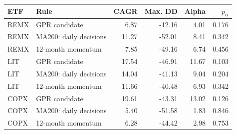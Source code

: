 \begin{tabular}{@{}llrrrr@{}}
\toprule
ETF & Rule & CAGR & Max. DD & Alpha & $p_{\alpha}$ \\
\midrule
REMX & GPR candidate & 6.87 & -12.16 & 4.01 & 0.176 \\
REMX & MA200: daily decisions & 11.27 & -52.01 & 8.41 & 0.342 \\
REMX & 12-month momentum & 7.85 & -49.16 & 6.74 & 0.456 \\
LIT & GPR candidate & 17.54 & -46.91 & 11.67 & 0.103 \\
LIT & MA200: daily decisions & 14.04 & -41.13 & 9.04 & 0.204 \\
LIT & 12-month momentum & 11.66 & -40.48 & 6.93 & 0.342 \\
COPX & GPR candidate & 19.61 & -43.31 & 13.02 & 0.126 \\
COPX & MA200: daily decisions & 5.40 & -51.58 & 1.83 & 0.846 \\
COPX & 12-month momentum & 6.28 & -44.42 & 2.98 & 0.753 \\
\bottomrule
\end{tabular}